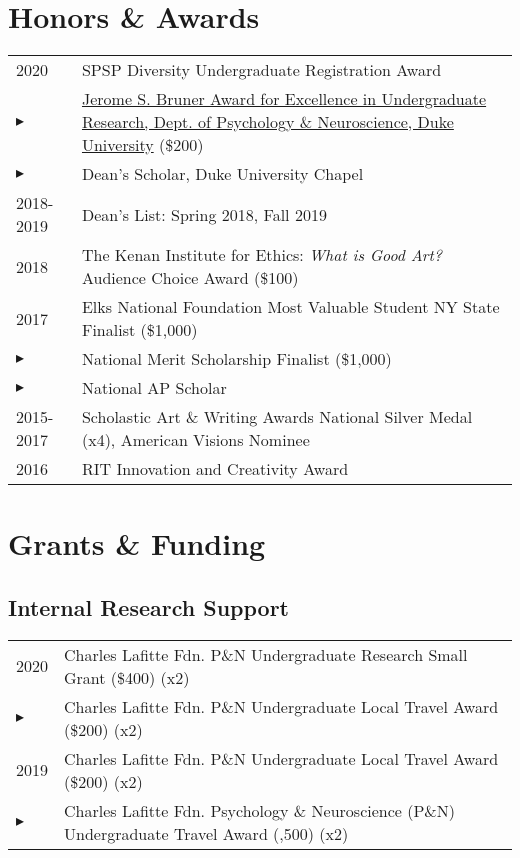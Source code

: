 \documentclass[10pt,a4paper]{cv-nl}
\begin{document}
\section{Honors \& Awards}
\vspace{2.5pt}
\begingroup
\renewcommand{\arraystretch}{1.5} 
\begin{tabular}{p{1in}<{\raggedleft\arraybackslash}p{4.935in}}
2020 & SPSP Diversity Undergraduate Registration Award \\
$\blacktriangleright$ & \href{https://psychandneuro.duke.edu/undergraduate/current/awards}{Jerome S. Bruner Award for Excellence in Undergraduate Research, Dept. of Psychology \& Neuroscience, Duke University} (\$200) \\
$\blacktriangleright$ & Dean's Scholar, Duke University Chapel \\
2018-2019 & Dean's List: Spring 2018, Fall 2019 \\
2018 & The Kenan Institute for Ethics: \textit{What is Good Art?} Audience Choice Award (\$100)\\
2017 & Elks National Foundation Most Valuable Student NY State Finalist (\$1,000) \\
$\blacktriangleright$ & National Merit Scholarship Finalist (\$1,000) \\
$\blacktriangleright$ & National AP Scholar \\
2015-2017 & Scholastic Art \& Writing Awards National Silver Medal (x4), American Visions Nominee \\
2016 & RIT Innovation and Creativity Award \\
\end{tabular}
\endgroup
\vspace{10pt}

\section{Grants \& Funding}
\vspace{5pt}
\subsection{Internal Research Support}
\vspace{2.5pt}
\begingroup
\renewcommand{\arraystretch}{1.5} 
\begin{tabular}{p{1in}<{\raggedleft\arraybackslash}p{4.935in}}
2020 & Charles Lafitte Fdn. P\&N Undergraduate Research Small Grant (\$400) (x2) \\
$\blacktriangleright$ & Charles Lafitte Fdn. P\&N Undergraduate Local Travel Award (\$200) (x2) \\
2019 & Charles Lafitte Fdn. P\&N Undergraduate Local Travel Award (\$200) (x2) \\
$\blacktriangleright$ & Charles Lafitte Fdn. Psychology \& Neuroscience (P\&N) Undergraduate Travel Award (\Dollar1,500) (x2)
\end{tabular}
\endgroup
\vspace{5pt}
\end{document}
